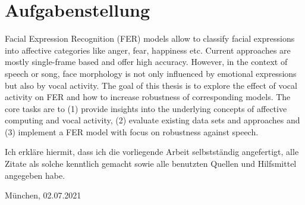 \documentclass[11pt,a4paper,twoside]{article}
\begin{document}
\clearpage
\section*{Aufgabenstellung}

Facial Expression Recognition (FER) models allow to classify facial expressions into affective categories like anger, fear, happiness etc.
Current approaches are mostly single-frame based and offer high accuracy.
However, in the context of speech or song, face morphology is not only influenced by emotional expressions but also by vocal activity.
The goal of this thesis is to explore the effect of vocal activity on FER and how to increase robustness of corresponding models.
The core tasks are to (1) provide insights into the underlying concepts of affective computing and vocal activity, (2) evaluate existing data sets and approaches and (3) implement a FER model with focus on robustness against speech.

\vfill %

\noindent Ich erkläre hiermit, dass ich die vorliegende Arbeit
selbstständig angefertigt, alle Zitate als solche kenntlich gemacht
sowie alle benutzten Quellen und Hilfsmittel angegeben habe.

\bigskip\noindent München, 02.07.2021

\vspace{4ex}\noindent\makebox[7cm]{\dotfill}


\cleardoublepage
\pagestyle{fancy}
\setcounter{page}{1}

\tableofcontents


\cleardoublepage

\setcounter{page}{1}
\fancyhead[LE,RO]{\rightmark}
\fancyhead[LO,RE]{\leftmark}
\fancyfoot[LE,RO]{\thepage}






% 

\end{document}
